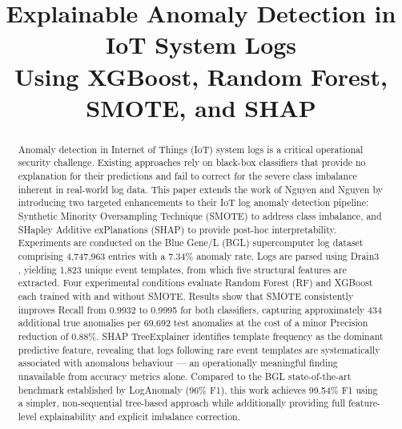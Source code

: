 \documentclass[conference]{IEEEtran}
\begin{document}
\title{Explainable Anomaly Detection in IoT System Logs\\
Using XGBoost, Random Forest, SMOTE, and SHAP}

\author{
}

\maketitle

\begin{abstract}
Anomaly detection in Internet of Things (IoT) system logs is a critical
operational security challenge. Existing approaches rely on black-box
classifiers that provide no explanation for their predictions and fail to
correct for the severe class imbalance inherent in real-world log data. This
paper extends the work of Nguyen and Nguyen \cite{nguyen2023} by introducing
two targeted enhancements to their IoT log anomaly detection pipeline:
Synthetic Minority Oversampling Technique (SMOTE) \cite{chawla2002} to address
class imbalance, and SHapley Additive exPlanations (SHAP) \cite{lundberg2017}
to provide post-hoc interpretability. Experiments are conducted on the
Blue Gene/L (BGL) supercomputer log dataset \cite{zhu2023loghub} comprising
4{,}747{,}963 entries with a 7.34\% anomaly rate. Logs are parsed using
Drain3 \cite{he2017drain}, yielding 1{,}823 unique event templates, from
which five structural features are extracted. Four experimental conditions
evaluate Random Forest (RF) and XGBoost each trained with and without SMOTE.
Results show that SMOTE consistently improves Recall from 0.9932 to 0.9995
for both classifiers, capturing approximately 434 additional true anomalies
per 69{,}692 test anomalies at the cost of a minor Precision reduction of
0.88\%. SHAP TreeExplainer identifies template frequency as the dominant
predictive feature, revealing that logs following rare event templates are
systematically associated with anomalous behaviour --- an operationally
meaningful finding unavailable from accuracy metrics alone. Compared to the
BGL state-of-the-art benchmark established by LogAnomaly
\cite{meng2019loganomaly} (96\% F1), this work achieves 99.54\% F1 using a
simpler, non-sequential tree-based approach while additionally providing full
feature-level explainability and explicit imbalance correction.
\end{abstract}
\end{document}
